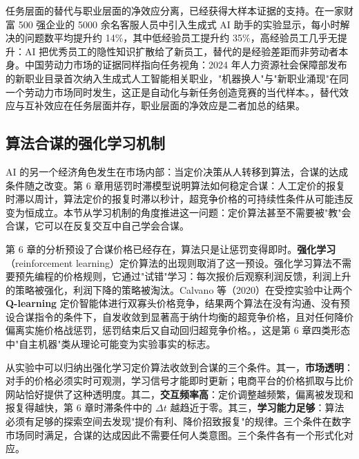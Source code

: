 任务层面的替代与职业层面的净效应分离，已经获得大样本证据的支持。在一家财富 500 强企业的 5000 余名客服人员中引入生成式 AI 助手的实验显示，每小时解决的问题数平均提升约 14\%，其中低经验员工提升约 35\%，高经验员工几乎无提升：AI 把优秀员工的隐性知识扩散给了新员工，替代的是经验差距而非劳动者本身。中国劳动力市场的证据同样指向任务视角：2024 年人力资源社会保障部发布的新职业目录首次纳入生成式人工智能相关职业，"机器换人"与"新职业涌现"在同一个劳动力市场同时发生，这正是自动化与新任务创造竞赛的当代样本。，替代效应与互补效应在任务层面并存，职业层面的净效应是二者加总的结果。

\subsection{算法合谋的强化学习机制}

AI 的另一个经济角色发生在市场内部：当定价决策从人转移到算法，合谋的达成条件随之改变。第 6 章用惩罚时滞模型说明算法如何稳定合谋：人工定价的报复时滞以周计，算法定价的报复时滞以秒计，超竞争价格的可持续性条件从可能违反变为恒成立。本节从学习机制的角度推进这一问题：定价算法甚至不需要被"教"会合谋，它可以在反复交互中自己学会合谋。

第 6 章的分析预设了合谋价格已经存在，算法只是让惩罚变得即时。\textbf{强化学习}（reinforcement learning）定价算法的出现则取消了这一预设。强化学习算法不需要预先编程的价格规则，它通过"试错"学习：每次报价后观察利润反馈，利润上升的策略被强化，利润下降的策略被淘汰。Calvano 等（2020）在受控实验中让两个 \textbf{Q-learning} 定价智能体进行双寡头价格竞争，结果两个算法在没有沟通、没有预设合谋指令的条件下，自发收敛到显著高于纳什均衡的超竞争价格，且对任何降价偏离实施价格战惩罚，惩罚结束后又自动回归超竞争价格。，这是第 6 章四类形态中"自主机器"类从理论可能变为实验事实的标志。

从实验中可以归纳出强化学习定价算法收敛到合谋的三个条件。其一，\textbf{市场透明}：对手的价格必须实时可观测，学习信号才能即时更新；电商平台的价格抓取与比价网站恰好提供了这种透明度。其二，\textbf{交互频率高}：定价调整越频繁，偏离被发现和报复得越快，第 6 章时滞条件中的 $\Delta t$ 越趋近于零。其三，\textbf{学习能力足够}：算法必须有足够的探索空间去发现"提价有利、降价招致报复"的规律。三个条件在数字市场同时满足，合谋的达成因此不需要任何人类意图。三个条件各有一个形式化对应。


